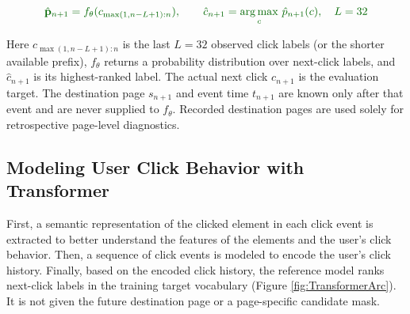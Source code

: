 \documentclass[sn-mathphys-num, Numbered]{sn-jnl}%
\theoremstyle{thmstyleone}%
\theoremstyle{thmstyletwo}%
\theoremstyle{thmstylethree}%
\providecommand{\DIFadd}[1]{{\protect\color{green!40!black}#1}} %
\providecommand{\DIFdel}[1]{}                      %
\providecommand{\DIFaddbegin}{} %
\providecommand{\DIFaddend}{} %
\providecommand{\DIFdelbegin}{} %
\providecommand{\DIFdelend}{} %
\newcommand{\DIFscaledelfig}{0.5}
\newlength{\DIFdelgraphicswidth} %
\newlength{\DIFdelgraphicsheight} %
\newcommand{\DIFaddincludegraphics}[2][]{{\color{blue}\fbox{\DIFOincludegraphics[#1]{#2}}}} %
\newcommand{\DIFdelincludegraphics}[2][]{%
\sbox{\DIFdelgraphicsbox}{\DIFOincludegraphics[#1]{#2}}%
\settoboxwidth{\DIFdelgraphicswidth}{\DIFdelgraphicsbox} %
\settoboxtotalheight{\DIFdelgraphicsheight}{\DIFdelgraphicsbox} %
\scalebox{\DIFscaledelfig}{%
\parbox[b]{\DIFdelgraphicswidth}{\usebox{\DIFdelgraphicsbox}\\[-\baselineskip] \rule{\DIFdelgraphicswidth}{0em}}\llap{\resizebox{\DIFdelgraphicswidth}{\DIFdelgraphicsheight}{%
\setlength{\unitlength}{\DIFdelgraphicswidth}%
\begin{picture}(1,1)%
\thicklines\linethickness{2pt} %
{\color[rgb]{1,0,0}\put(0,0){\framebox(1,1){}}}%
{\color[rgb]{1,0,0}\put(0,0){\line( 1,1){1}}}%
{\color[rgb]{1,0,0}\put(0,1){\line(1,-1){1}}}%
\end{picture}%
}\hspace*{3pt}}} %
} %
\DeclareRobustCommand{\DIFaddbegin}{\DIFOaddbegin \let\includegraphics\DIFaddincludegraphics} %
\DeclareRobustCommand{\DIFaddend}{\DIFOaddend \let\includegraphics\DIFOincludegraphics} %
\DeclareRobustCommand{\DIFdelbegin}{\DIFOdelbegin \let\includegraphics\DIFdelincludegraphics} %
\DeclareRobustCommand{\DIFdelend}{\DIFOaddend \let\includegraphics\DIFOincludegraphics} %
\begin{document}
\DIFdelbegin \begin{displaymath}\DIFdel{%

	UNCP\footnote{User Next Click Prediction}(c_{n+1}) =f(s_{n+1}, t_{n+1}, e_{1:n})
}\end{displaymath}%
\DIFdelend \DIFaddbegin \begin{equation}\DIFadd{\label{eincn4}
	\hat{\mathbf p}_{n+1}=f_{\theta}(c_{\max(1,n-L+1):n}),\qquad \hat c_{n+1}=\operatorname*{arg\,max}_{c}\,\hat p_{n+1}(c),\quad L=32
}\end{equation}\DIFaddend 


\DIFdelbegin \DIFdel{Where in this equation, }\DIFdelend \DIFaddbegin \DIFadd{Here $c_{\max(1,n-L+1):n}$ is the last $L=32$ observed click labels (or the shorter available prefix), $f_{\theta}$ returns a probability distribution over next-click labels, and $\hat c_{n+1}$ is its highest-ranked label. The actual next click $c_{n+1}$ is the evaluation target. The destination page }\DIFaddend $s_{n+1}$ \DIFdelbegin \DIFdel{represents the page in the $(n+1)$-th event,
}\DIFdelend \DIFaddbegin \DIFadd{and event time }\DIFaddend $t_{n+1}$ \DIFdelbegin \DIFdel{represents the timestamp of the $(n+1)$-th event,
$e_{1:n}$ represents the click sequence derived from the user's click history as mentioned in previous formulas.
Finally, $c_{n+1}$ represents the User Next Click, which is a function $f$ applied to the aforementioned elements. }\DIFdelend \DIFaddbegin \DIFadd{are known only after that event and are never supplied to $f_{\theta}$. Recorded destination pages are used solely for retrospective page-level diagnostics.
}\DIFaddend 

\subsection{Modeling User Click Behavior with Transformer}
First, a semantic representation of the clicked element in each click event is extracted to better understand the features of the elements and the user's click behavior.
Then, a sequence of click events is modeled to encode the user's click history.
Finally, based on the \DIFdelbegin \DIFdel{encoding of the previous click events, a model is designed to select the element most likely to be clicked from all the active and clickable elements on the current page }\DIFdelend \DIFaddbegin \DIFadd{encoded click history, the reference model ranks next-click labels in the training target vocabulary }\DIFaddend (Figure \ref{fig:TransformerArc}). \DIFaddbegin \DIFadd{It is not given the future destination page or a page-specific candidate mask.
}\DIFaddend 
\end{document}
